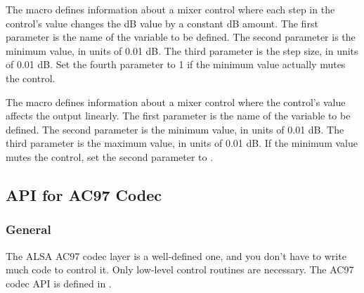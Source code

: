 \documentclass[a4paper,8pt,english]{sphinxmanual}
\begin{document}
The  macro defines information
about a mixer control where each step in the control's value changes the
dB value by a constant dB amount. The first parameter is the name of the
variable to be defined. The second parameter is the minimum value, in
units of 0.01 dB. The third parameter is the step size, in units of 0.01
dB. Set the fourth parameter to 1 if the minimum value actually mutes
the control.

The  macro defines information
about a mixer control where the control's value affects the output
linearly. The first parameter is the name of the variable to be defined.
The second parameter is the minimum value, in units of 0.01 dB. The
third parameter is the maximum value, in units of 0.01 dB. If the
minimum value mutes the control, set the second parameter to
.


\subsection{API for AC97 Codec}
\label{sound/kernel-api/writing-an-alsa-driver:api-for-ac97-codec}

\subsubsection{General}
\label{sound/kernel-api/writing-an-alsa-driver:id5}
The ALSA AC97 codec layer is a well-defined one, and you don't have to
write much code to control it. Only low-level control routines are
necessary. The AC97 codec API is defined in .
\end{document}
